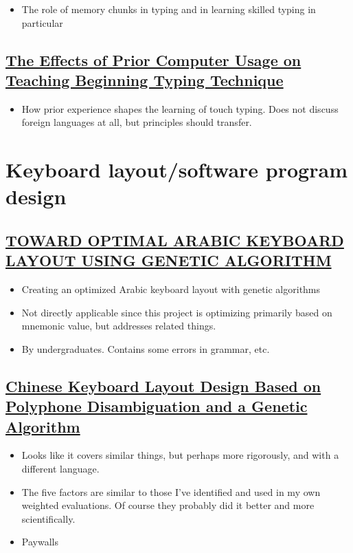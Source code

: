 \documentclass[11pt]{article}
\begin{document}
\begin{itemize}
\item The role of memory chunks in typing and in learning skilled typing in particular
\end{itemize}

\subsection{\href{https://www.jstor.org/stable/41063973}{The Effects of Prior Computer Usage on Teaching Beginning Typing Technique}}
\label{sec:orgf49ad50}

\begin{itemize}
\item How prior experience shapes the learning of touch typing. Does not discuss foreign languages at all, but principles should transfer.
\end{itemize}

\section{Keyboard layout/software program design}
\label{sec:org6435ad8}

\subsection{\href{https://pdfs.semanticscholar.org/1bf8/74dcaa7f21c2cc3c6c5e526b61a9ee352bba.pdf}{TOWARD OPTIMAL ARABIC KEYBOARD LAYOUT USING GENETIC ALGORITHM}}
\label{sec:org02224ea}

\begin{itemize}
\item Creating an optimized Arabic keyboard layout with genetic algorithms
\item Not directly applicable since this project is optimizing primarily based on mnemonic value, but addresses related things.
\item By undergraduates. Contains some errors in grammar, etc.
\end{itemize}

\subsection{\href{https://www.tandfonline.com/doi/abs/10.1080/10447318.2013.777827}{Chinese Keyboard Layout Design Based on Polyphone Disambiguation and a Genetic Algorithm}}
\label{sec:orgba3c33b}

\begin{itemize}
\item Looks like it covers similar things, but perhaps more rigorously, and with a different language.
\item The five factors are similar to those I've identified and used in my own weighted evaluations. Of course they probably did it better and more scientifically.
\item Paywalls
\end{itemize}
\end{document}
